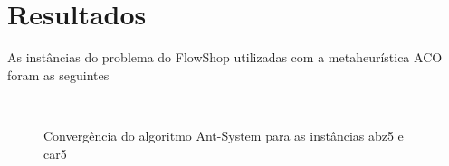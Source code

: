 \section{Resultados}

As instâncias do problema do FlowShop utilizadas com a metaheurística ACO foram
as seguintes


\begin{figure}[htp]
  \begin{center}
    \\
  \end{center}
  \caption{Convergência do algoritmo Ant-System para as instâncias abz5 e car5}
  \label{fig:edge}
\end{figure}

